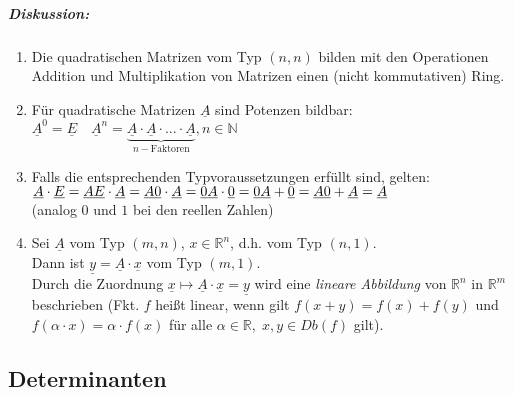 \subparagraph{Diskussion:}
\begin{enumerate}
\item Die quadratischen Matrizen vom Typ $(n,n)$ bilden mit den Operationen Addition und Multiplikation von Matrizen einen (nicht kommutativen) Ring.
\item Für quadratische Matrizen $\underline{A}$ sind Potenzen bildbar: \\
$\boxed{\underline{A}^0=\underline{E} \quad \underline{A}^n=\underbrace{\underline{A}\cdot\underline{A}\cdot ... \cdot\underline{A}}_{n-\text{Faktoren}}, n \in \mathbb{N}}$
\item Falls die entsprechenden Typvoraussetzungen erfüllt sind, gelten:\\
$\underline{A}\cdot \underline{E}=\underline{A}\\
\underline{E}\cdot \underline{A}=\underline{A}\\
\underline{0}\cdot \underline{A} = \underline{0}\\
\underline{A} \cdot \underline{0} = \underline{0}\\
\underline{A} + \underline{0} = \underline{A}\\
\underline{0} + \underline{A} = \underline{A}$\\
(analog $0$ und $1$ bei den reellen Zahlen)
\item Sei $\underline{A}$ vom Typ $(m,n)$, $x \in \mathbb{R}^n$, d.h. vom Typ $(n,1)$.\\ Dann ist $\boxed{\underline{y}= \underline{A} \cdot \underline{x}}$ vom Typ $(m,1)$.\\
Durch die Zuordnung $\underline{x}\longmapsto \underline{A}\cdot \underline{x} = \underline{y}$ wird eine \emph{lineare Abbildung} von $\mathbb{R}^n$ in $\mathbb{R}^m$ beschrieben (Fkt. $f$ heißt linear, wenn gilt $f(x+y)=f(x)+f(y)$ und $f(\alpha \cdot x)=\alpha \cdot f(x)$ für alle $\alpha \in \mathbb{R}, \; x,y \in Db(f)$ gilt).
\end{enumerate}

\subsection{Determinanten}
